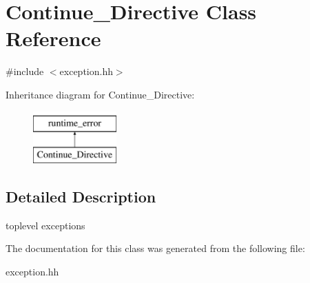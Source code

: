 \hypertarget{classContinue__Directive}{\section{Continue\-\_\-\-Directive Class Reference}
\label{classContinue__Directive}
}


{\ttfamily \#include $<$exception.\-hh$>$}

Inheritance diagram for Continue\-\_\-\-Directive\-:\begin{figure}[H]
\begin{center}
\leavevmode
\includegraphics[height=2.000000cm]{classContinue__Directive}
\end{center}
\end{figure}


\subsection{Detailed Description}
toplevel exceptions 

The documentation for this class was generated from the following file\-:\begin{DoxyCompactItemize}
\item 
exception.\-hh\end{DoxyCompactItemize}
